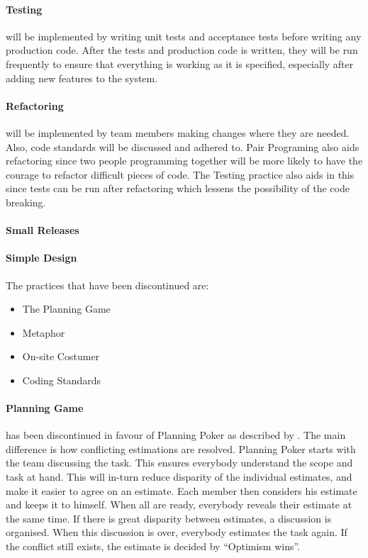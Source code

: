 \paragraph{Testing} will be implemented by writing unit tests and acceptance tests before writing any production code. After the tests and production code is written, they will be run frequently to ensure that everything is working as it is specified, especially after adding new features to the system.

\paragraph{Refactoring} will be implemented by team members making changes where they are needed. Also, code standards will be discussed and adhered to. Pair Programing also aids refactoring since two people programming together will be more likely to have the courage to refactor difficult pieces of code. The Testing practice also aids in this since tests can be run after refactoring which lessens the possibility of the code breaking.

\paragraph{Small Releases} %

\paragraph{Simple Design}%

The practices that have been discontinued are:
\begin{itemize}
\item The Planning Game
\item Metaphor
\item On-site Costumer
\item Coding Standards
\end{itemize}

\paragraph{Planning Game} has been discontinued in favour of Planning Poker as described by \citet{xp:planningPoker}.
The main difference is how conflicting estimations are resolved.
Planning Poker starts with the team discussing the task. This ensures everybody understand the scope and task at hand. This will in-turn reduce disparity of the individual estimates, and make it easier to agree on an estimate. Each member then considers his estimate and keeps it to himself. When all are ready, everybody reveals their estimate at the same time. If there is great disparity between estimates, a discussion is organised. When this discussion is over, everybody estimates the task again. If the conflict still exists, the estimate is decided by ``Optimism wins''.

